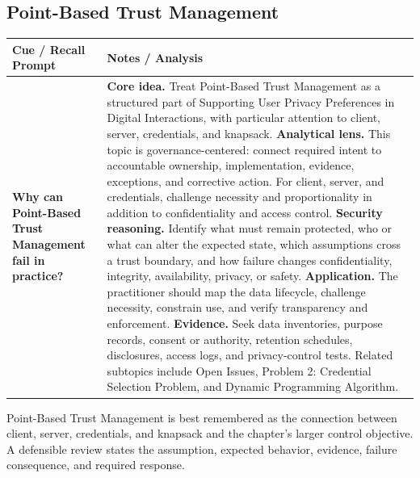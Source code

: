 \documentclass[11pt]{article}
\newcommand{\CornellHeader}{%
\rowcolor{Navy}\color{white}\bfseries Cue / Recall Prompt & \color{white}\bfseries Notes / Analysis\\\hline}
\newcommand{\CornellRow}[2]{%
\cellcolor{CueGray}\RaggedRight\textbf{#1} & \RaggedRight #2\\\hline}
\begin{document}
\subsection*{Point-Based Trust Management}
\begin{longtable}{>{\RaggedRight\arraybackslash}p{}|>{\RaggedRight\arraybackslash}p{}}
\CornellHeader
\CornellRow{Why can Point-Based Trust Management fail in practice?}{\textbf{Core idea.} Treat Point-Based Trust Management as a structured part of Supporting User Privacy Preferences in Digital Interactions, with particular attention to client, server, credentials, and knapsack. \textbf{Analytical lens.} This topic is governance-centered: connect required intent to accountable ownership, implementation, evidence, exceptions, and corrective action. For client, server, and credentials, challenge necessity and proportionality in addition to confidentiality and access control. \textbf{Security reasoning.} Identify what must remain protected, who or what can alter the expected state, which assumptions cross a trust boundary, and how failure changes confidentiality, integrity, availability, privacy, or safety. \textbf{Application.} The practitioner should map the data lifecycle, challenge necessity, constrain use, and verify transparency and enforcement. \textbf{Evidence.} Seek data inventories, purpose records, consent or authority, retention schedules, disclosures, access logs, and privacy-control tests. Related subtopics include Open Issues, Problem 2: Credential Selection Problem, and Dynamic Programming Algorithm.}
\end{longtable}
\begin{topicsummary}
Point-Based Trust Management is best remembered as the connection between client, server, credentials, and knapsack and the chapter's larger control objective. A defensible review states the assumption, expected behavior, evidence, failure consequence, and required response.
\end{topicsummary}
\end{document}
